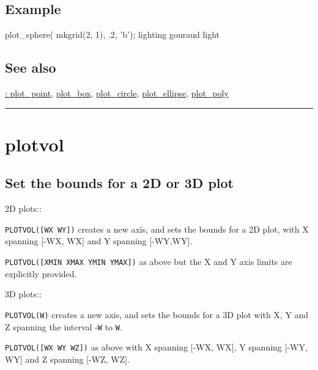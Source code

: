 \subsection*{Example}
\begin{Code}
   plot_sphere( mkgrid(2, 1), .2, 'b'); %
   lighting gouraud  %
   light

\end{Code}

\subsection*{See also}


\hyperlink{: plot_point}{\color{blue} : plot\_point}, \hyperlink{plot_box}{\color{blue} plot\_box}, \hyperlink{plot_circle}{\color{blue} plot\_circle}, \hyperlink{plot_ellipse}{\color{blue} plot\_ellipse}, \hyperlink{plot_poly}{\color{blue} plot\_poly}

\vspace{1.5ex}\rule{\textwidth}{1mm}

\hypertarget{plotvol}{\section*{plotvol}}
\subsection*{Set the bounds for a 2D or 3D plot}


2D plots::



\texttt{PLOTVOL([WX WY])} creates a new axis, and sets the bounds for a 2D plot,
with X spanning [-WX, WX] and Y spanning [-WY,WY].



\texttt{PLOTVOL([XMIN XMAX YMIN YMAX])} as above but the X and Y axis limits are explicitly provided.



3D plots::



\texttt{PLOTVOL(W)} creates a new axis, and sets the bounds for a 3D plot with X, Y and Z spanning
the interval -\texttt{W} to \texttt{W}.



\texttt{PLOTVOL([WX WY WZ])} as above with X spanning [-WX, WX], Y spanning [-WY, WY] and Z
spanning [-WZ, WZ].



